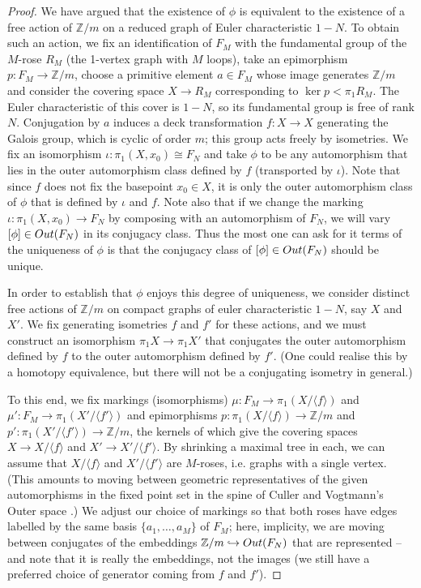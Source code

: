\documentclass[11pt, a4 paper]{amsart}
\numberwithin{equation}{section}
\theoremstyle{remark}
\theoremstyle{definition}
\def\Z{\mathbb Z}
\def\outN{{\rm{Out}}(F_N)}
\def\<{\langle}
\def\>{\rangle}
\begin{document}
\begin{proof}
	We have argued that the existence of $\phi$ 
	is equivalent to the existence of a free action of $\Z/m$ 
	on a reduced graph of Euler characteristic $1-N$. 
	To obtain such an action, 
	we fix an identification of $F_M$ 
	with the fundamental group of the $M$-rose $R_M$ 
	(the 1-vertex graph with $M$ loops), 
	take an epimorphism ${p:F_M\to \Z/m}$, 
	choose a primitive element $a\in F_M$ 
	whose image generates $\Z/m$ 
	and consider the covering space $X\to R_M$ 
	corresponding to $\ker p<\pi_1 R_M$. 
	The Euler characteristic of this cover is $1-N$, 
	so its fundamental group is free of rank $N$. 
	Conjugation by $a$ induces 
	a deck transformation $f : X\to X$ 
	generating the Galois group, which is cyclic of order $m$; 
	this group acts freely by isometries. 
	We fix an isomorphism $\iota:\pi_1(X,x_0)\cong F_N$ 
	and take $\phi$ to be any automorphism 
	that lies in the outer automorphism class defined by $f$ 
	(transported by $\iota$). 
	Note that since $f$ does not fix the basepoint $x_0\in X$, it is only the outer automorphism class of $\phi$ that is defined
	by $\iota$ and $f$. Note also that if we change the marking $\iota:\pi_1(X,x_0)\to F_N$
	by composing with an automorphism of $F_N$, we will vary $[\phi]\in\outN$ in its conjugacy class. Thus the
	most one can ask for it terms of the uniqueness of $\phi$ is that the conjugacy class of $[\phi]\in\outN$
	should be unique.
	
	In order to establish that $\phi$ enjoys this degree of uniqueness,  
	we consider distinct free actions of $\Z/m$ on compact graphs of euler characteristic
	$1-N$, say $X$ and $X'$.
	We fix generating isometries $f$ and $f'$ for these actions, and we must construct an isomorphism $\pi_1X\to \pi_1X'$
	that conjugates the outer automorphism defined by $f$ to the outer automorphism defined by $f'$. (One could realise
	this by a homotopy equivalence, but there will not be a conjugating isometry in general.)
	
	To this end, we fix markings (isomorphisms)
	$\mu:F_M\to \pi_1(X/\<f\>)$ 
	and $\mu':F_M\to \pi_1(X'/\<f'\>)$ 
	and epimorphisms $p: \pi_1(X/\<f\>)\to \Z/m$
	and ${p': \pi_1(X'/\<f'\>)\to \Z/m}$, 
	the kernels of which give the covering spaces 
	$X\to X/\<f\>$ and $X'\to X'/\<f'\>$. 
	By shrinking a maximal tree in each, 
	we can assume that $X/\<f\>$ and $X'/\<f'\>$ 
	are $M$-roses, i.e. graphs with a single vertex. 
	(This amounts to moving between geometric representatives 
	of the given automorphisms in the fixed point set 
	in the spine of Culler and Vogtmann's Outer space 
	\cite{culler1986moduli}.) 
	We adjust our choice of markings so that both roses have edges labelled by the same basis $\{a_1,\dots,a_M\}$
	of $F_M$; here, implicity, we are moving between conjugates of the embeddings $\Z/m\hookrightarrow \outN$
	that are represented -- and note that it is really the embeddings, not the images 
	(we still have a preferred choice of generator 
	coming from $f$ and $f'$). 
	

\end{proof}
\end{document}

